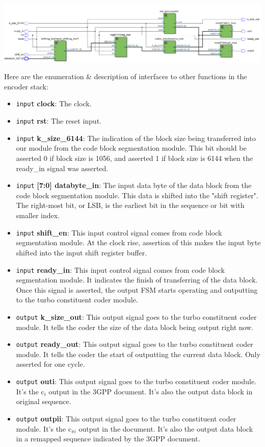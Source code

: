 \documentclass[letterpaper, 12pt]{article} %
\begin{document}
\begin{center}
    \includegraphics[width=\textwidth]{files/rtl_all}
\end{center}
Here are the enumeration \& description of interfaces to other functions in the encoder stack:
\begin{itemize}
    \item \texttt{input} {\bf clock}: The clock.
    \item \texttt{input} {\bf rst}: The reset input.
    \item \texttt{input} {\bf k\_size\_6144}: The indication of the block size being transferred into our module from the code block segmentation module. This bit should be asserted 0 if block size is 1056, and asserted 1 if block size is 6144 when the ready\_in signal was asserted.
    \item \texttt{input} {\bf [7:0] databyte\_in}: The input data byte of the data block from the code block segmentation module. This data is shifted into the "shift register". The right-most bit, or LSB, is the earliest bit in the sequence or bit with smaller index.
    \item \texttt{input} {\bf shift\_en}: This input control signal comes from code block segmentation module. At the clock rise, assertion of this makes the input byte shifted into the input shift register buffer.
    \item \texttt{input} {\bf ready\_in}: This input control signal comes from code block segmentation module. It indicates the finish of transferring of the data block. Once this signal is asserted, the output FSM starts operating and outputting to the turbo constituent coder module.
    \item \texttt{output} {\bf k\_size\_out}: This output signal goes to the turbo constituent coder module. It tells the coder the size of the data block being output right now.
    \item \texttt{output} {\bf ready\_out}: This output signal goes to the turbo constituent coder module. It tells the coder the start of outputting the current data block. Only asserted for one cycle.
    \item \texttt{output} {\bf outi}: This output signal goes to the turbo constituent coder module. It's the c$_i$ output in the 3GPP document. It's also the output data block in original sequence.
    \item \texttt{output} {\bf outpii}: This output signal goes to the turbo constituent coder module. It's the c$_{\pi i}$ output in the document. It's also the output data block in a remapped sequence indicated by the 3GPP document.
\end{itemize}
\end{document}
